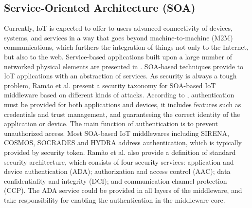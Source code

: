 \subsection{Service-Oriented Architecture (SOA)}
Currently, IoT is expected to offer to users advanced connectivity of devices, systems, and services in a way that goes beyond machine-to-machine (M2M) communications, which furthers the integration of things not only to the Internet, but also to the web. Service-based applications built upon a large number of networked physical elements are presented in \cite{giusto2010internet}. SOA-based techniques provide to IoT applications with an abstraction of services. As security is always a tough problem, Ram{\~a}o et al.\cite{tiburski2015importance} present a security taxonomy for SOA-based IoT middleware based on different kinds of attacks. According to \cite{tiburski2015importance}, authentication must be provided for both applications and devices, it includes features such as credentials and trust management, and guaranteeing the correct identity of the application or device. The main function of authentication is to prevent unauthorized access. Most SOA-based IoT middlewares including SIRENA, COSMOS, SOCRADES and HYDRA address authentication, which is typically provided by security token. Ram{\~a}o et al. also provide a definition of standard security architecture, which consists of four security services: application and device authentication (ADA); authorization and access control (AAC); data confidentiality and integrity (DCI); and communication channel protection (CCP). The ADA service could be provided in all layers of the middleware, and take responsibility for enabling the authentication in the middleware core.
